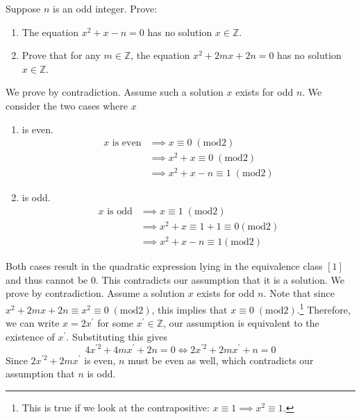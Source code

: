 \documentclass{article}
\begin{document}
    \begin{exercise}
      Suppose $n$ is an odd integer. Prove:
      \begin{enumerate}
        \item The equation $x^2 + x - n = 0$ has no solution $x \in \mathbb{Z}$.
        \item Prove that for any $m \in \mathbb{Z}$, the equation $x^2 + 2mx + 2n = 0$ has no solution $x \in \mathbb{Z}$.
      \end{enumerate}
    \end{exercise}
    \begin{solution}
      We prove by contradiction. Assume such a solution $x$ exists for odd $n$. We consider the two cases where $x$ 
      \begin{enumerate}
        \item is even. 
        \begin{align}
          x \text{ is even} & \implies x \equiv 0 \; (\mathrm{mod } 2) \\
                            & \implies x^2 + x \equiv 0 \; (\mathrm{mod } 2) \\
                            & \implies x^2 + x - n \equiv 1 \; (\mathrm{mod } 2)
        \end{align} 

        \item is odd. 
        \begin{align}
          x \text{ is odd} & \implies x \equiv 1 \; (\mathrm{mod } 2) \\
                           & \implies x^2 + x \equiv 1 + 1 \equiv 0 (\mathrm{mod } 2) \\
                           & \implies x^2 + x - n \equiv 1 (\mathrm{mod } 2) 
        \end{align}
      \end{enumerate}
      Both cases result in the quadratic expression lying in the equivalence class $[1]$ and thus cannot be $0$. This contradicts our assumption that it is a solution. 
      We prove by contradiction. Assume a solution $x$ exists for odd $n$. Note that since $x^2 + 2mx + 2n \equiv x^2 \equiv 0 \; (\mathrm{mod } 2)$, this implies that $x \equiv 0 \; (\mathrm{mod } 2)$.\footnote{This is true if we look at the contrapositive: $x \equiv 1 \implies x^2 \equiv 1$. } Therefore, we can write $x = 2x^\prime$ for some $x^\prime \in \mathbb{Z}$, our assumption is equivalent to the existence of $x^\prime$. Substituting this gives 
      \begin{equation}
        4 x^{\prime 2} + 4 m x^\prime + 2n = 0 \iff 2x^{\prime 2} + 2m x^\prime + n = 0
      \end{equation} 
      Since $2x^{\prime 2} + 2 m x^\prime$ is even, $n$ must be even as well, which contradicts our assumption that $n$ is odd. 
    \end{solution}
\end{document}

